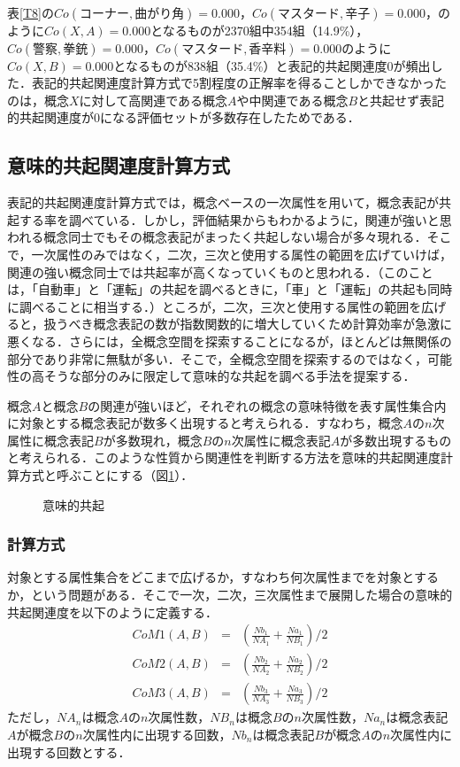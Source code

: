 表\ref{T8}の$Co(コーナー,曲がり角)=0.000$，$Co(マスタード,辛子)=0.000$，のように$Co(X,A)=0.000$となるものが2370組中354組（14.9\%），$Co(警察,拳銃)=0.000$，$Co(マスタード,香辛料)=0.000$のように$Co(X,B)=0.000$となるものが838組（35.4\%）と表記的共起関連度0が頻出した．表記的共起関連度計算方式で5割程度の正解率を得ることしかできなかったのは，概念$X$に対して高関連である概念$A$や中関連である概念$B$と共起せず表記的共起関連度が0になる評価セットが多数存在したためである．

\subsection{意味的共起関連度計算方式}

表記的共起関連度計算方式では，概念ベースの一次属性を用いて，概念表記が共起する率を調べている．しかし，評価結果からもわかるように，関連が強いと思われる概念同士でもその概念表記がまったく共起しない場合が多々現れる．そこで，一次属性のみではなく，二次，三次と使用する属性の範囲を広げていけば，関連の強い概念同士では共起率が高くなっていくものと思われる．（このことは，「自動車」と「運転」の共起を調べるときに，「車」と「運転」の共起も同時に調べることに相当する．）ところが，二次，三次と使用する属性の範囲を広げると，扱うべき概念表記の数が指数関数的に増大していくため計算効率が急激に悪くなる．さらには，全概念空間を探索することになるが，ほとんどは無関係の部分であり非常に無駄が多い．そこで，全概念空間を探索するのではなく，可能性の高そうな部分のみに限定して意味的な共起を調べる手法を提案する．

概念$A$と概念$B$の関連が強いほど，それぞれの概念の意味特徴を表す属性集合内に対象とする概念表記が数多く出現すると考えられる．すなわち，概念$A$の$n$次属性に概念表記$B$が多数現れ，概念$B$の$n$次属性に概念表記$A$が多数出現するものと考えられる．このような性質から関連性を判断する方法を意味的共起関連度計算方式と呼ぶことにする（図\ref{Fig3}）．

\begin{figure}[tb]
\begin{center}
\end{center}
\caption{意味的共起}
\label{Fig3}
\end{figure}

\subsubsection{計算方式}

対象とする属性集合をどこまで広げるか，すなわち何次属性までを対象とするか，という問題がある．そこで一次，二次，三次属性まで展開した場合の意味的共起関連度を以下のように定義する．
\begin{eqnarray}
CoM1(A,B) &=& \left(\frac{Nb_1}{NA_1} + \frac{Na_1}{NB_1} \right) / 2 \\
CoM2(A,B) &=& \left(\frac{Nb_2}{NA_2} + \frac{Na_2}{NB_2} \right) / 2 \\
CoM3(A,B) &=& \left(\frac{Nb_3}{NA_3} + \frac{Na_3}{NB_3} \right) / 2 
\end{eqnarray}
ただし，$NA_n$は概念$A$の$n$次属性数，$NB_n$は概念$B$の$n$次属性数，$Na_n$は概念表記$A$が概念$B$の$n$次属性内に出現する回数，$Nb_n$は概念表記$B$が概念$A$の$n$次属性内に出現する回数とする．

